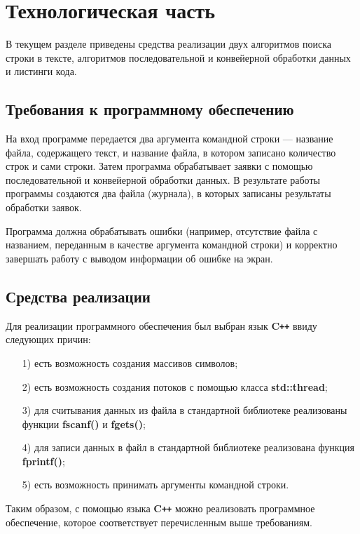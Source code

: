 \chapter{Технологическая часть}

В текущем разделе приведены средства реализации двух алгоритмов поиска строки в тексте, алгоритмов последовательной и конвейерной обработки данных и листинги кода.

\section{Требования к программному обеспечению}

На вход программе передается два аргумента командной строки --- название файла, содержащего текст, и название файла, в котором записано количество строк и сами строки. 
Затем программа обрабатывает заявки с помощью последовательной и конвейерной обработки данных. 
В результате работы программы создаются два файла (журнала), в которых записаны результаты обработки заявок.

Программа должна обрабатывать ошибки (например, отсутствие файла с названием, переданным в качестве аргумента командной строки) и корректно завершать работу с выводом информации об ошибке на экран.
 
\section{Средства реализации}

Для реализации программного обеспечения был выбран язык \textbf{C\texttt{++}} ввиду следующих причин:

\begin{enumerate}
\item[1)] есть возможность создания массивов символов;
\item[2)] есть возможность создания потоков с помощью класса \textbf{std::thread};
\item[3)] для считывания данных из файла в стандартной библиотеке реализованы функции \textbf{fscanf()} и \textbf{fgets()};
\item[4)] для записи данных в файл в стандартной библиотеке реализована функция \textbf{fprintf()};
\item[5)] есть возможность принимать аргументы командной строки.
\end{enumerate}

Таким образом, с помощью языка \textbf{C\texttt{++}} можно реализовать программное обеспечение, которое соответствует перечисленным выше требованиям.

